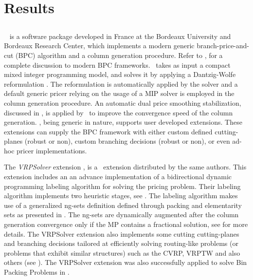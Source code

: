 \chapter{Results}
\label{sec:results}

\section{\bapcod}
\label{sec:results-bapcod}

\textit{\bapcod}\ \parencite{sadykov2021} is a software package
developed in France at the Bordeaux University and Bordeaux Research Center,
which implements a modern generic branch-price-and-cut (BPC) algorithm
and a column generation procedure.
Refer to \textcite{sadykov2019b}, for a complete discussion to modern BPC frameworks.
\bapcod\ takes as input a compact mixed integer programming model,
and solves it by applying a Dantzig-Wolfe reformulation \parencite{dantzig1960}.
The reformulation is automatically applied by the solver
and a default generic pricer relying on
the usage of a MIP solver is employed in the column generation procedure.
An automatic dual price smoothing stabilization, discussed in \textcite{pessoa2018automation},
is applied by \bapcod\ to improve the convergence speed of the column generation.
\bapcod, being generic in nature,
supports user developed extensions.
These extensions can supply the BPC framework with either
custom defined cutting-planes (robust or non), custom branching decisions (robust or non),
or even ad-hoc pricer implementations.

The \textit{VRPSolver} extension \parencite{pessoa2020a}, is
a \bapcod\ extension distributed by the same authors.
This extension includes an
an advance implementation of a bidirectional dynamic programming labeling algorithm
\parencite{sadykov2021a} for solving the pricing problem.
Their labeling algorithm implements two heuristic stages, see \textcite{sadykov2021a}.
The labeling algorithm makes use of a generalized ng-sets definition \parencite{baldacci2011}
defined through packing and elementarity sets as presented in \textcite{pessoa2020a}.
The ng-sets are dynamically augmented \parencite{roberti2014}
after the column generation convergence only if the MP contains a fractional solution,
see \textcite{pessoa2020a} for more details.
The VRPSolver extension also implements
some cutting cutting-planes and branching decisions
tailored at efficiently solving routing-like problems
(or problems that exhibit similar structures)
such as the CVRP, VRPTW and also others (see \cite{pessoa2020a}).
The VRPSolver extension was also successfully applied
to solve Bin Packing Problems in \textcite{pessoa2020}.

